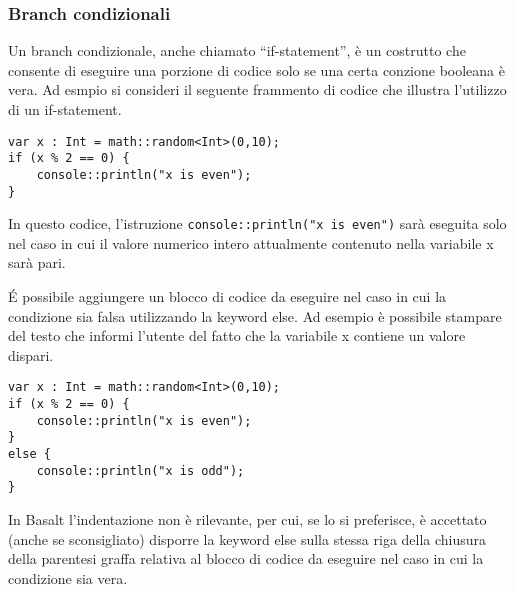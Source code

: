 \subsubsection{Branch condizionali}
Un branch condizionale, anche chiamato “if-statement”, è un costrutto che consente di eseguire una porzione di codice solo se una certa conzione booleana è vera. Ad esmpio si consideri 
il seguente frammento di codice che illustra l’utilizzo di un if-statement.


\vspace{0.5cm}

\begin{lstlisting}[frame=single]
var x : Int = math::random<Int>(0,10);
if (x % 2 == 0) {
    console::println("x is even");
}
\end{lstlisting}


\vspace{0.5cm}

In questo codice, l’istruzione \texttt{console::println("x is even")} sarà eseguita solo nel caso in cui il valore numerico intero attualmente contenuto nella variabile x sarà pari. 

É possibile aggiungere un blocco di codice da eseguire nel caso in cui la condizione sia falsa utilizzando la keyword else. Ad esempio è possibile stampare del testo che 
informi l’utente del fatto che la variabile x contiene un valore dispari.

\vspace{0.5cm}

\begin{lstlisting}[frame=single]
var x : Int = math::random<Int>(0,10);
if (x % 2 == 0) {
    console::println("x is even");
}
else {
    console::println("x is odd");
}    
\end{lstlisting}


\vspace{0.5cm}

In Basalt l’indentazione non è rilevante, per cui, se lo si preferisce, è accettato (anche se sconsigliato) disporre la keyword else sulla stessa riga della 
chiusura della parentesi graffa relativa al blocco di codice da eseguire nel caso in cui la condizione sia vera.